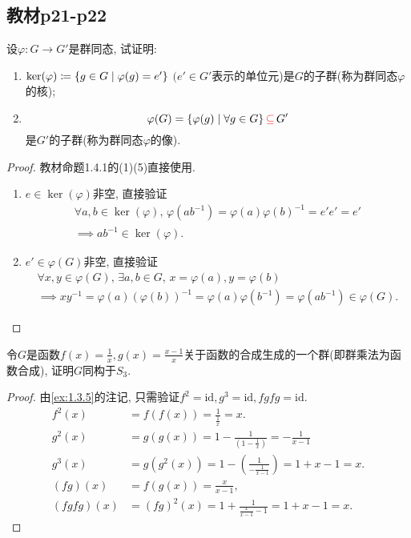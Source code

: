 \subsection{教材p21-p22}

\begin{problem}\label{ex:1.4.1}
    设$\varphi:G \to G'$是群同态, 试证明:
    \begin{enumerate}[(1)]
        \item $\ker(\varphi) \mathrel{\coloneqq} \{g \in G \mid \varphi(g) = e'\}$ $(e' \in G'$表示的单位元)是$G$的子群(称为群同态$\varphi$的核);
        \item
        \[
            \varphi(G) = \{\varphi(g) \mid \forall g \in G\} \,\textcolor{red}{\subseteq}\, G'
        \]
        是$G'$的子群(称为群同态$\varphi$的像).
    \end{enumerate}
\end{problem}

\begin{proof}
    教材命题1.4.1的(1)(5)直接使用.
    \begin{enumerate}[(1)]
        \item $e \in \ker(\varphi)$非空, 直接验证
        \[
        \begin{gathered}
            \forall a, b \in \ker(\varphi),\, \varphi(ab^{-1}) = \varphi(a)\varphi(b)^{-1} = e'e' = e'\\
            \implies ab^{-1} \in \ker(\varphi).
        \end{gathered}
        \]
        \item $e' \in \varphi(G)$非空, 直接验证
        \[
        \begin{gathered}
            \forall x, y \in \varphi(G),\, \exists a, b \in G,\, x = \varphi(a), y = \varphi(b)\\
            \implies xy^{-1} = \varphi(a)(\varphi(b))^{-1} = \varphi(a)\varphi(b^{-1}) = \varphi(ab^{-1}) \in \varphi(G).
        \end{gathered}
        \]
    \end{enumerate}
\end{proof}

\begin{problem}
    令$G$是函数$f(x) = \frac1x, g(x) = \frac{x-1}x$关于函数的合成生成的一个群(即群乘法为函数合成), 证明$G$同构于$S_3$.
\end{problem}

\begin{proof}
    由\ref{ex:1.3.5}的注记, 只需验证$f^2 = \mathrm{id}, g^3 = \mathrm{id}, fgfg = \mathrm{id}$.
    \[
    \begin{aligned}
        f^2(x) &= f(f(x)) = \frac{1}{\frac{1}{x}} = x.\\
        g^2(x) &= g(g(x)) = 1 - \frac{1}{(1 - \frac{1}{x})} = -\frac{1}{x - 1}\\
        g^3(x) &= g(g^2(x)) = 1 - (\frac{1}{-\frac{1}{x - 1}}) = 1 + x - 1 = x.\\
        (fg)(x) &= f(g(x)) = \frac{x}{x - 1},\\
        (fgfg)(x) &= (fg)^2(x) = 1 + \frac{1}{\frac{x}{x - 1} - 1} = 1 + x - 1 = x.
    \end{aligned}
    \]
\end{proof}

